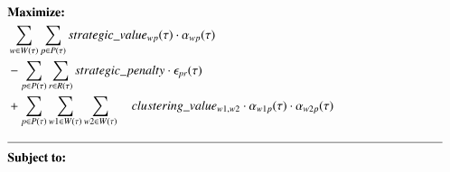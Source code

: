 \begin{alignat}{2}
	& \textbf{Maximize:} \notag                                                                                                                                                                                                                                                                                                                                                     \label{eqn:objective:strategic}                                     \\
	& \sum_{\ElementWorkOrder \in \SetWorkOrder{}} \sum_{\ElementPeriod \in \SetPeriod} \ParStrategicValue \cdot \VarStrategicWorkOrderAssignment{\ElementWorkOrder}{\ElementPeriod}  \notag                                                                                                                                                                                                                             \\ 
	& - \sum_{\ElementPeriod \in \SetPeriod} \sum_{\ElementResource \in \SetResource} \ParStrategicPenalty \cdot \VarStrategicExcess     \notag                                                                                                                                                                                                                                                                          \\
	& + \sum_{\ElementPeriod \in \SetPeriod} \sum_{\ElementWorkOrder1 \in \SetWorkOrder{}} \sum_{\ElementWorkOrder2 \in \SetWorkOrder{}} 	 \quad \ParClusteringValue \cdot \VarStrategicWorkOrderAssignment{\ElementWorkOrder1}{\ElementPeriod} \cdot \VarStrategicWorkOrderAssignment{\ElementWorkOrder2}{\ElementPeriod}                                                                                             \\
	& \text{\rule{\linewidth}{0.4pt}} \notag                                                                                                                                                                                                                                                                                                                                                                             \\
	& \textbf{Subject to:} \notag                                                                                                                                                                                                                                                                                                                                                                                        \\

\end{alignat}
